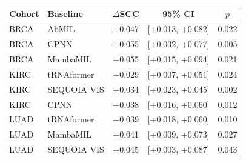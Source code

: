 \begin{tabular}{llccc}
\toprule
Cohort & Baseline & $\Delta$SCC & 95\% CI & $p$\\
\midrule
BRCA & AbMIL & +0.047 & [+0.013, +0.082] & 0.022\\
BRCA & CPNN & +0.055 & [+0.032, +0.077] & 0.005\\
BRCA & MambaMIL & +0.055 & [+0.015, +0.094] & 0.021\\
KIRC & tRNAformer & +0.029 & [+0.007, +0.051] & 0.024\\
KIRC & SEQUOIA VIS & +0.034 & [+0.023, +0.045] & 0.002\\
KIRC & CPNN & +0.038 & [+0.016, +0.060] & 0.012\\
LUAD & tRNAformer & +0.039 & [+0.018, +0.060] & 0.010\\
LUAD & MambaMIL & +0.041 & [+0.009, +0.073] & 0.027\\
LUAD & SEQUOIA VIS & +0.045 & [+0.003, +0.087] & 0.043\\
\bottomrule
\end{tabular}